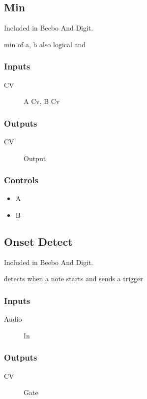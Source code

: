 \subsection{Min}

Included in Beebo And Digit.

min of a, b also logical and



\subsubsection{Inputs}
\begin{description}
\item [CV] A Cv, B Cv
\end{description}

\subsubsection{Outputs}
\begin{description}
\item [CV] Output
\end{description}

\subsubsection{Controls}
\begin{itemize}
\item A
\item B
\end{itemize}

\subsection{Onset Detect}

Included in Beebo And Digit.

detects when a note starts and sends a trigger



\subsubsection{Inputs}
\begin{description}
\item [Audio] In
\end{description}

\subsubsection{Outputs}
\begin{description}
\item [CV] Gate
\end{description}

